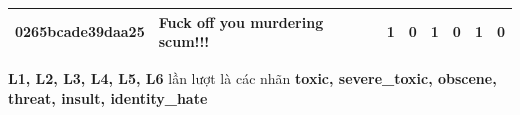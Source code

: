 \begin{table}[htb!]
{\begin{minipage}{0.88\textheight}
\begin{threeparttable}
\begin{tabularx}{\textwidth}{L{0.95} L{6.25} C{0.135} C{0.135} C{0.135} C{0.135} C{0.135} C{0.135}}
                    0265bcade39daa25 & Fuck off you murdering scum!!!                                                                                                   & 1           & 0           & 1           & 0           & 1           & 0           \\
                    \bottomrule
                \end{tabularx}
                \begin{tablenotes}
                    \fontsize{8pt}{12pt}\selectfont
                    \item \textbf{L1, L2, L3, L4, L5, L6} lần lượt là các nhãn \textbf{toxic, severe\_toxic, obscene, threat, insult, identity\_hate}
                \end{tablenotes}
            \end{threeparttable}
        \end{minipage}%
    }
\end{table}

